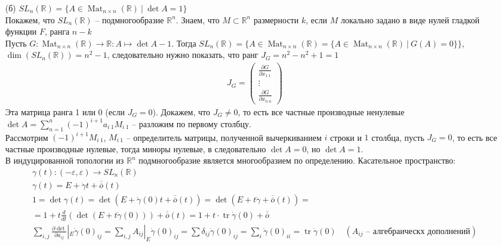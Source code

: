 \begin{enumerate}
\item[(б)]
	$SL_n(\mathbb{R}) = \{A \in \operatorname{Mat}_{n \times n}(\mathbb{R})\ |\ \det A = 1\}$\\
	Покажем, что $SL_n(\mathbb{R})$ -- подмногообразие $\mathbb{R}^n$. Знаем, что $M \subset \mathbb{R}^n$ размерности $k$, если $M$ локально задано в виде нулей гладкой функции $F$, ранга $n-k$\\
	Пусть $G: \operatorname{Mat}_{n \times n}(\mathbb{R}) \to \mathbb{R}: A \mapsto \det A - 1$. Тогда $SL_n(\mathbb{R}) = \{A \in \operatorname{Mat}_{n \times n}(\mathbb{R}) = \{A \in \operatorname{Mat}_{n \times n}(\mathbb{R})\ |\ G(A) = 0\}\}$, $\dim (SL_n(\mathbb{R})) = n^2 - 1$, следовательно нужно показать, что ранг $J_{G} = n^2 - n^2 + 1 = 1$
	\begin{gather*}
	J_{G} = 
	\begin{pmatrix}
		\frac{\partial G}{\partial x_{1\ 1}} \\ \vdots \\ \frac{\partial G}{\partial x_{n\ n}}
	\end{pmatrix}
	\end{gather*}
	Эта матрица ранга 1 или 0 (если $J_{G} = 0$). Докажем, что $J_{G} \ne 0$, то есть все частные производные ненулевые\\
	$\det A = \sum\limits_{n = 1}^{n} (-1)^{i+1} a_{i\ 1} M_{i\ 1}$ -- разложим по первому столбцу.\\
	Рассмотрим $(-1)^{i+1} M_{i\ 1}$, $M_{i\ 1}$ -- определитель матрицы, полученной вычеркиванием $i$ строки и $1$ столбца, пусть $J_{G} = 0$, то есть все частные производные нулевые, тогда миноры нулевые, в следовательно $\det A = 0$, но $\det A = 1$.\\
	В индуцированной топологии из $\mathbb{R}^n$ подмногообразие является многообразием по определению.
	\vskip 0.2in
	Касательное пространство:
	\begin{gather*}
		\gamma(t): (-\varepsilon, \varepsilon) \to SL_n(\mathbb{R})\\
		\gamma(t) = E + \dot{\gamma}t + \overline{\overline{o}}(t)\\
		1 = \det \gamma(t) = \det (E + \dot{\gamma}(0)t + \overline{\overline{o}}(t)) = \det(E + t \dot{\gamma} + \overline{\overline{o}}(t)) = \\
		= 1 + t \frac{d}{dt} (\det (E + t \dot{\gamma}(0))) + \overline{\overline{o}}(t) = 1 + t \cdot \operatorname{tr} \dot{\gamma}(0) + \overline{\overline{o}}\\
		\sum\limits_{i,j} \frac{\partial \det}{\partial a_{ij}} |_{E} \dot{\gamma}(0)_{ij} = \sum\limits_{i,j} A_{ij}|_{E} \dot{\gamma}(0)_{ij} = \sum \delta_{ij} \dot{\gamma}(0)_{ij} = \sum\limits_{i} \dot{\gamma}(0)_{ii} = \operatorname{tr} \dot{\gamma}(0)\quad (A_{ij} \text{ -- алгебраическх дополнений})\\

\end{gather*}
\end{enumerate}
